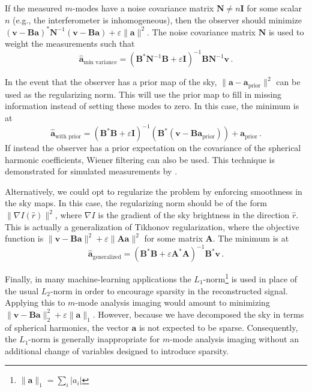 \documentclass[twocolumn]{aastex61}
\renewcommand{\b}{\pmb}
\begin{document}
If the measured $m$-modes have a noise covariance matrix $\b N \neq n\b I$ for some scalar $n$
(e.g., the interferometer is inhomogeneous), then the observer should minimize $(\b v-\b B\b a)^*\b
N^{-1}(\b v-\b B\b a) + \varepsilon\|\b a\|^2$. The noise covariance matrix $\b N$ is used to weight
the measurements such that
\begin{equation}
    \b{\hat a}_\text{min variance} = (\b B^*\b N^{-1}\b B + \varepsilon\b I)^{-1}
        \b B\b N^{-1}\b v\,.
\end{equation}

In the event that the observer has a prior map of the sky, $\|\b a - \b a_\text{prior}\|^2$ can be
used as the regularizing norm. This will use the prior map to fill in missing information instead of
setting these modes to zero. In this case, the minimum is at
\begin{equation}
    \b{\hat a}_\text{with prior} = (\b B^*\b B + \varepsilon\b I)^{-1}
        (\b B^*(\b v - \b B\b a_\text{prior}))
        + \b a_\text{prior}\,.
\end{equation}
If instead the observer has a prior expectation on the covariance of the spherical harmonic
coefficients, Wiener filtering can also be used.  This technique is demonstrated for simulated
measurements by \citet{2016arXiv161203255B}.

Alternatively, we could opt to regularize the problem by enforcing smoothness in the sky maps. In
this case, the regularizing norm should be of the form $\|\nabla I(\hat r)\|^2$, where $\nabla I$ is
the gradient of the sky brightness in the direction $\hat r$. This is actually a generalization of
Tikhonov regularization, where the objective function is $\|\b v-\b B\b a\|^2 + \varepsilon\|\b A\b
a\|^2$ for some matrix $\b A$. The minimum is at
\begin{equation}
    \b{\hat a}_\text{generalized} = (\b B^*\b B + \varepsilon\b A^*\b A)^{-1}\b B^*\b v\,.
\end{equation}

Finally, in many machine-learning applications the $L_1$-norm\footnote{
    $\|\b a\|_1 = \sum_i |a_i|$
} is used in place of the usual $L_2$-norm in order to encourage sparsity in the reconstructed
signal. Applying this to $m$-mode analysis imaging would amount to minimizing $\|\b v-\b B\b a\|_2^2
+ \varepsilon\|\b a\|_1$. However, because we have decomposed the sky in terms of spherical
harmonics, the vector $\b a$ is not expected to be sparse. Consequently, the $L_1$-norm is generally
inappropriate for $m$-mode analysis imaging without an additional change of variables designed to
introduce sparsity.
\end{document}
